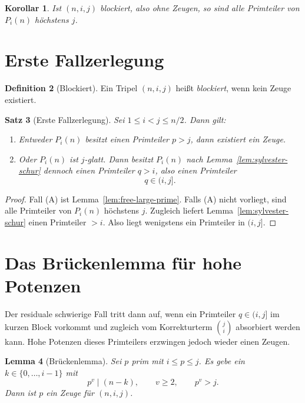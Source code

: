 \documentclass[12pt,a4paper]{article}
\theoremstyle{plain}
\newtheorem{theorem}{Satz}[section]
\newtheorem{lemma}[theorem]{Lemma}
\newtheorem{corollary}[theorem]{Korollar}
\theoremstyle{definition}
\newtheorem{definition}[theorem]{Definition}
\theoremstyle{remark}
\begin{document}
	\begin{corollary}
		\label{cor:j-smooth}
		Ist \((n,i,j)\) blockiert, also ohne Zeugen, so sind alle Primteiler von \(P_i(n)\) höchstens \(j\).
	\end{corollary}
	
	\section{Erste Fallzerlegung}
	
	\begin{definition}[Blockiert]
		Ein Tripel \((n,i,j)\) heißt \emph{blockiert}, wenn kein Zeuge existiert.
	\end{definition}
	
	\begin{theorem}[Erste Fallzerlegung]
		\label{thm:first-reduction}
		Sei \(1\le i<j\le n/2\). Dann gilt:
		\begin{enumerate}[label=\textup{(\Alph*)}]
			\item Entweder \(P_i(n)\) besitzt einen Primteiler \(p>j\), dann existiert ein Zeuge.
			\item Oder \(P_i(n)\) ist \(j\)-glatt. Dann besitzt \(P_i(n)\) nach Lemma~\ref{lem:sylvester-schur} dennoch einen Primteiler \(q>i\), also einen Primteiler
			\[
			q\in(i,j].
			\]
		\end{enumerate}
	\end{theorem}
	
	\begin{proof}
		Fall (A) ist Lemma~\ref{lem:free-large-prime}. Falls (A) nicht vorliegt, sind alle Primteiler von \(P_i(n)\) höchstens \(j\). Zugleich liefert Lemma~\ref{lem:sylvester-schur} einen Primteiler \(>i\). Also liegt wenigstens ein Primteiler in \((i,j]\).
	\end{proof}
	
	\section{Das Brückenlemma für hohe Potenzen}
	
	Der residuale schwierige Fall tritt dann auf, wenn ein Primteiler \(q\in(i,j]\) im kurzen Block vorkommt und zugleich vom Korrekturterm \(\binom ji\) absorbiert werden kann. Hohe Potenzen dieses Primteilers erzwingen jedoch wieder einen Zeugen.
	
	\begin{lemma}[Brückenlemma]
		\label{lem:bridge}
		Sei \(p\) prim mit \(i\le p\le j\). Es gebe ein \(k\in\{0,\dots,i-1\}\) mit
		\[
		p^v\mid (n-k),\qquad v\ge2,\qquad p^v>j.
		\]
		Dann ist \(p\) ein Zeuge für \((n,i,j)\).
	\end{lemma}
	
\end{document}
